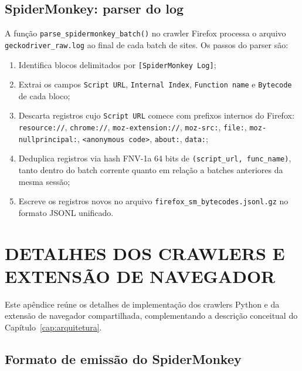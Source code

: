 \section{SpiderMonkey: parser do log}
\label{ap:sm-parser}

A função \texttt{parse\_spidermonkey\_batch()} no crawler Firefox processa
o arquivo \texttt{geckodriver\_raw.log} ao final de cada batch de sites.
Os passos do parser são:

\begin{enumerate}
  \item Identifica blocos delimitados por \texttt{[SpiderMonkey Log]};
  \item Extrai os campos \texttt{Script URL}, \texttt{Internal Index},
    \texttt{Function name} e \texttt{Bytecode} de cada bloco;
  \item Descarta registros cujo \texttt{Script URL} comece com prefixos internos
    do Firefox: \texttt{resource://}, \texttt{chrome://},
    \texttt{moz-extension://}, \texttt{moz-src:}, \texttt{file:},
    \texttt{moz-nullprincipal:}, \texttt{<anonymous code>}, \texttt{about:},
    \texttt{data:};
  \item Deduplica registros via hash FNV-1a 64 bits de
    \texttt{(script\_url, func\_name)}, tanto dentro do batch corrente
    quanto em relação a batches anteriores da mesma sessão;
  \item Escreve os registros novos no arquivo
    \texttt{firefox\_sm\_bytecodes.jsonl.gz} no formato JSONL unificado.
\end{enumerate}

\chapter{DETALHES DOS CRAWLERS E EXTENSÃO DE NAVEGADOR}
\label{ap:crawler-ext}

Este apêndice reúne os detalhes de implementação dos crawlers Python e da
extensão de navegador compartilhada, complementando a descrição conceitual do
Capítulo~\ref{cap:arquitetura}.

\section{Formato de emissão do SpiderMonkey}
\label{ap:sm-formato}

